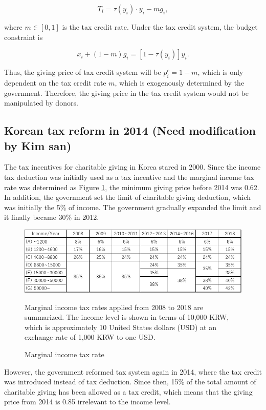\documentclass[ review  , 3p ]{elsarticle}
\begin{document}
  \[
      T_i = \tau(y_i)\cdot y_i - m g_i,
  \]
  
  where \(m \in [0, 1]\) is the tax credit rate. Under the tax credit system, the budget constraint is
  
  \[
      x_i + (1 - m) g_i = [1 - \tau(y_i)] y_i.
  \]
  
  Thus, the giving price of tax credit system will be \(p_i^c = 1 - m\), which is only dependent on the tax credit rate \(m\), which is exogenously determined by the government.
  Therefore, the giving price in the tax credit system would not be manipulated by donors.
  
  \hypertarget{korean-tax-reform-in-2014-need-modification-by-kim-san}{%
  \subsection{Korean tax reform in 2014 (Need modification by Kim san)}\label{korean-tax-reform-in-2014-need-modification-by-kim-san}}
  
  The tax incentives for charitable giving in Korea stared in 2000. Since the income tax deduction was initially used as a tax incentive and the marginal income tax rate was determined as Figure \ref{taxrate}, the minimum giving price before 2014 was 0.62. In addition, the government set the limit of charitable giving deduction, which was initially the 5\% of income. The government gradually expanded the limit and it finally became 30\% in 2012.
  
  \begin{figure}
  \centering\caption{Marginal income tax rate}\label{taxrate}
  \includegraphics[width=15cm,clip]{Tax_rate_fig.png}
  \begin{flushleft}\scriptsize
      Marginal income tax rates applied from 2008 to 2018 are summarized. The income level is shown in terms of 10,000 KRW, which is approximately 10 United States dollars (USD) at an exchange rate of 1,000 KRW to one USD. 
  \end{flushleft}
  \end{figure}
  
  However, the government reformed tax system again in 2014, where the tax credit was introduced instead of tax deduction. Since then, 15\% of the total amount of charitable giving has been allowed as a tax credit, which means that the giving price from 2014 is 0.85 irrelevant to the income level.
  
\end{document}
